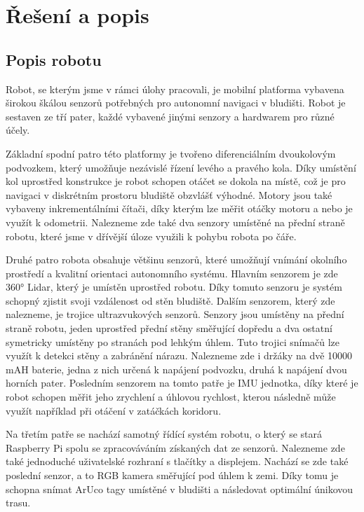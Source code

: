 \section{Řešení a popis}
\subsection{Popis robotu}

Robot, se kterým jsme v rámci úlohy pracovali, je mobilní platforma vybavena širokou škálou senzorů potřebných pro autonomní navigaci v bludišti. Robot je sestaven ze tří pater, každé vybavené jinými senzory a hardwarem pro různé účely.

Základní spodní patro této platformy je tvořeno diferenciálním dvoukolovým podvozkem, který umožňuje nezávislé řízení levého a pravého kola. Díky umístění kol uprostřed konstrukce je robot schopen otáčet se dokola na místě, což je pro navigaci v diskrétním prostoru bludiště obzvlášť výhodné. Motory jsou také vybaveny inkrementálními čítači, díky kterým lze měřit otáčky motoru a nebo je využít k odometrii. Nalezneme zde také dva senzory umístěné na přední straně robotu, které jsme v  dřívější úloze využili k pohybu robota po čáře.

Druhé patro robota obsahuje většinu senzorů, které umožňují vnímání okolního prostředí a kvalitní orientaci autonomního systému. Hlavním senzorem je zde 360° Lidar, který je umístěn uprostřed robotu. Díky tomuto senzoru je systém schopný zjistit svoji vzdálenost od stěn bludiště. Dalším senzorem, který zde nalezneme, je trojice ultrazvukových senzorů. Senzory jsou umístěny na přední straně robotu, jeden uprostřed přední stěny směřující dopředu a dva ostatní symetricky umístěny po stranách pod lehkým úhlem. Tuto trojici snímačů lze využít k detekci stěny a zabránění nárazu. Nalezneme zde i držáky na dvě 10000 mAH baterie, jedna z nich určená k napájení podvozku, druhá k napájení dvou horních pater. Posledním senzorem na tomto patře je IMU jednotka, díky které je robot schopen měřit jeho zrychlení a úhlovou rychlost, kterou následně může využít například při otáčení v zatáčkách koridoru.

Na třetím patře se nachází samotný řídící systém robotu, o který se stará Raspberry Pi spolu se zpracováváním získaných dat ze senzorů. Nalezneme zde také jednoduché uživatelské rozhraní s tlačítky a displejem. Nachází se zde také poslední senzor, a to RGB kamera směřující pod úhlem k zemi. Díky tomu je schopna snímat ArUco tagy umístěné v bludišti a následovat optimální únikovou trasu.

